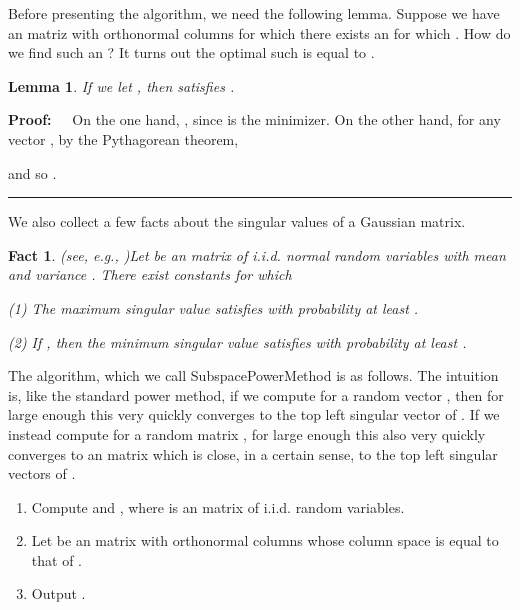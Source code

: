 \documentclass[11pt]{article}
\newtheorem{lemma}[theorem]{Lemma}
\newenvironment{proof}{\begin{trivlist} \item {\bf Proof:~~}}
  {\qed\end{trivlist}}
\def\qed{\hfill\rule{2mm}{2mm}}
\newtheorem{fact}{Fact}
\begin{document}
Before presenting the algorithm, we need the following lemma. 
Suppose we have an  matriz  with orthonormal
columns for which there exists an  for which . How do we find
such an ? It turns out the optimal such  is equal to .

\begin{lemma}\label{lem:kinside}
If we let , then  
satisfies . 
\end{lemma} 
\begin{proof}
On the one hand, , since  is the minimizer. On the other hand,
for any vector , by the Pythagorean theorem, 

and so . 
\end{proof}
We also collect a few facts about the singular values of a Gaussian matrix. 
\begin{fact}(see, e.g., \cite{RV10})\label{fact:gaussian}
Let  be an  matrix of i.i.d. normal random variables with mean  and variance . 
There exist constants  for which

(1) The maximum singular value  satisfies  with
probability at least . 

(2) If , then the minimum singular value  satisfies 
 with probability at least .
\end{fact}

The algorithm, which we call {\sf SubspacePowerMethod} is as follows. The intuition is, like
the standard power method, if we compute  for a 
random vector , then for large
enough  this very quickly converges to the top left singular vector of . If we instead
compute  for a random  matrix , for large
enough  this also very quickly converges to an  matrix which is close, in a certain
sense, to the top  left singular vectors of . 
\begin{enumerate}
\item Compute  and , where  
is an  matrix of i.i.d.  random variables.
\item Let  be an  matrix with orthonormal columns whose column space is equal to that of .
\item Output . 
\end{enumerate}
\end{document}
